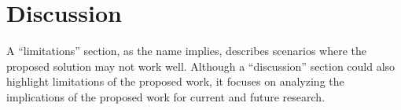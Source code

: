 \section{Discussion}\label{s:discussion}

A “limitations” section, as the name implies, describes scenarios where the
proposed solution may not work well. Although a “discussion” section could also
highlight limitations of the proposed work, it focuses on analyzing the
implications of the proposed work for current and future research.


\textcolor{lightgray}{\lipsum[26-32]}


